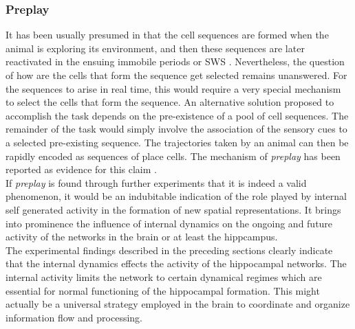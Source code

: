 \subsubsection{Preplay}
It has been usually presumed in that the cell sequences are formed when the animal is exploring its environment, and then these sequences are later reactivated in the ensuing immobile periods or SWS \cite{Foster2006, Davidson2009}. Nevertheless, the question of how are the cells that form the sequence get selected remains unanswered. For the sequences to arise in real time, this would require a very special mechanism to select the cells that form the sequence. An alternative solution proposed to accomplish the task depends on the pre-existence of a pool of cell sequences. The remainder of the task would simply involve the association of the sensory cues to a selected pre-existing sequence. The trajectories taken by an animal can then be rapidly encoded as sequences of place cells. The mechanism of \emph{preplay} has been reported as evidence for this claim  \cite{Dragoi2011, Dragoi2013a}.\\
If \emph{preplay} is found through further experiments that it is indeed a valid phenomenon, it would be an indubitable indication of the role played by internal self generated activity in the formation of new spatial representations. It brings into prominence the influence of internal dynamics on the ongoing and future activity of the networks in the brain or at least the hippcampus. \\


The experimental findings described in the preceding sections clearly indicate that the internal dynamics effects the activity of the hippocampal networks. The internal activity limits the network to certain dynamical regimes which are essential for normal functioning of the hippocampal formation. This might actually be a universal strategy employed in the brain to coordinate and organize information flow and processing. 